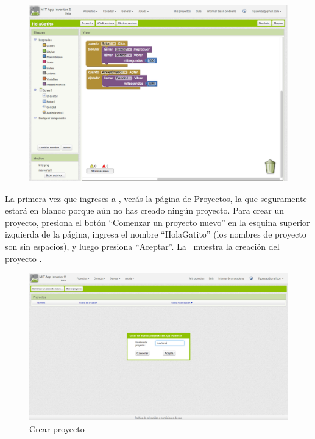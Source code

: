 \documentclass[letterpaper]{article}
\begin{document}
\begin{figure}[H]
\centering
\includegraphics[scale=0.25]{figures/blockEditor}
\caption{\blockEditor}
\label{fig:blockEditor}
\end{figure}

La primera vez que ingreses a \aiurl, verás la página de Proyectos, la
que seguramente estará en blanco porque aún no has creado ningún
proyecto. Para crear un proyecto, presiona el botón ``Comenzar un
proyecto nuevo'' en la esquina superior izquierda de la página,
ingresa el nombre ``HolaGatito'' (los nombres de proyecto son sin
espacios), y luego presiona ``Aceptar''. La~
muestra la creación del proyecto .

\begin{figure}[H]
\centering
\includegraphics[scale=0.25]{figures/crearProyecto}
\caption{Crear proyecto }
\label{fig:crearProyecto}
\end{figure}
\end{document}
